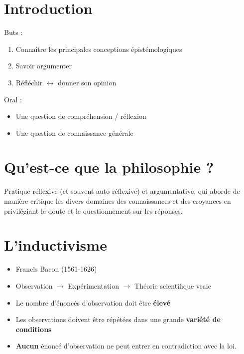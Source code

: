 \documentclass[fleqn,letterpaper, 12pt]{article}
\begin{document}
	
	
	
	
	
	
	\section{Introduction}
	
	Buts : 
	\begin{enumerate}
		\item Connaître les principales conceptions épistémologiques
		\item Savoir argumenter
		\item Réfléchir $\leftrightarrow$  donner son opinion
	\end{enumerate}
	
	Oral :
	\begin{itemize}
		\item Une question de compréhension / réflexion
		\item Une question de connaissance générale
	\end{itemize}

	\section{Qu'est-ce que la philosophie ?}
	
	Pratique réflexive (et souvent auto-réflexive) et argumentative, qui aborde de manière critique les divers domaines des connaissances et des croyances en privilégiant le doute et le questionnement sur les réponses.
	
	\section{L'inductivisme}
		
	\begin{itemize}
		\item Francis Bacon (1561-1626)
		\item Observation $\rightarrow$ Expérimentation $\rightarrow$ Théorie scientifique vraie
		\item Le nombre d'énoncés d'observation doit être \textbf{élevé}
		\item Les observations doivent être répétées dans une grande \textbf{variété de conditions}
		\item \textbf{Aucun} énoncé d'observation ne peut entrer en contradiction avec la loi.
	\end{itemize}
	
	
\end{document}
